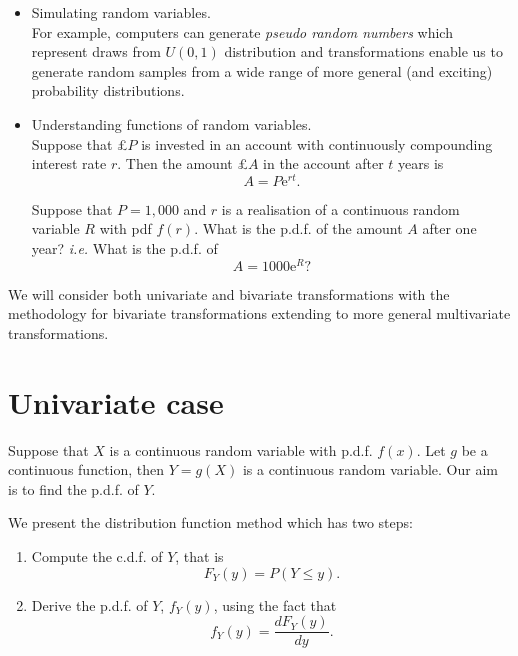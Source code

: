 \documentclass[
]{book}
\providecommand{\tightlist}{%
  \setlength{\itemsep}{0pt}\setlength{\parskip}{0pt}}
\begin{document}
\begin{itemize}
\tightlist
\item
  Simulating random variables.\\
  For example, computers can generate \emph{pseudo random numbers} which represent draws from \(U(0,1)\) distribution and transformations enable us to generate random samples from a wide range of more general (and exciting) probability distributions.\\
\item
  Understanding functions of random variables.\\
  Suppose that £\(P\) is invested in an account with continuously compounding interest rate \(r\). Then the amount £\(A\) in the account after \(t\) years is\\

  \[
  A=P \text{e}^{r t}.
  \]

  Suppose that \(P=1,000\) and \(r\) is a realisation of a continuous random variable \(R\) with pdf \(f(r)\). What is the p.d.f. of the amount \(A\) after one year? \emph{i.e.} What is the p.d.f. of\\

  \[
  A=1000 \text{e}^{R}?
  \]
\end{itemize}

We will consider both univariate and bivariate transformations with the methodology for bivariate transformations extending to more general multivariate transformations.

\hypertarget{Transform:univariate}{%
\section{Univariate case}\label{Transform:univariate}}

Suppose that \(X\) is a continuous random variable with p.d.f. \(f(x)\). Let \(g\) be a continuous function, then \(Y=g(X)\) is a continuous random variable. Our aim is to find the p.d.f. of \(Y\).

We present the distribution function method which has two steps:

\begin{enumerate}
\def\labelenumi{\arabic{enumi}.}
\tightlist
\item
  Compute the c.d.f. of \(Y\), that is\\

  \[F_Y(y)=P(Y \leq y).\]
\item
  Derive the p.d.f. of \(Y\), \(f_Y(y)\), using the fact that\\

  \[f_Y(y)=\dfrac{dF_Y(y)}{dy}.\]
\end{enumerate}
\end{document}
